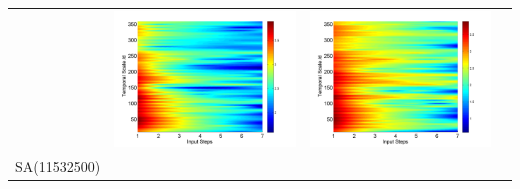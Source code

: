 \documentclass[review]{elsarticle}
\begin{document}
\begin{table}[H]
\begin{tabular}{cccc}
&\begin{minipage}{.3\textwidth}\includegraphics[width=\linewidth]{resultgraph/05585000pep_rela.png}\end{minipage}
&\begin{minipage}{.3\textwidth}\includegraphics[width=\linewidth]{resultgraph/05585000pepq_rela.png}\end{minipage}
\\
SA(11532500)

\end{tabular}
\end{table}
\end{document}
